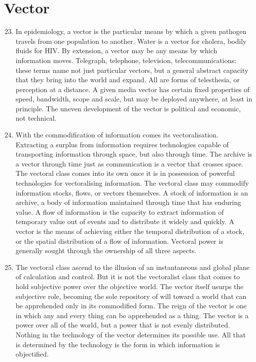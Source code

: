 \documentclass[letterpaper,12pt,english]{sphinxmanual}
\begin{document}
\section{Vector}
\label{wark:vector}\begin{enumerate}
\setcounter{enumi}{22}
\item {} 
In epidemiology, a vector is the particular means by which a given pathogen travels from one population to another. Water is a vector for cholera, bodily fluids for HIV. By extension, a vector may be any means by which information moves. Telegraph, telephone, television, telecommunications: these terms name not just particular vectors, but a general abstract capacity that they bring into the world and expand. All are forms of telesthesia, or perception at a distance. A given media vector has certain fixed properties of speed, bandwidth, scope and scale, but may be deployed anywhere, at least in principle. The uneven development of the vector is political and economic, not technical.

\item {} 
With the commodification of information comes its vectoralisation. Extracting a surplus from information requires technologies capable of transporting information through space, but also through time. The archive is a vector through time just as communication is a vector that crosses space. The vectoral class comes into its own once it is in possession of powerful technologies for vectoralising information. The vectoral class may commodify information stocks, flows, or vectors themselves. A stock of information is an archive, a body of information maintained through time that has enduring value. A flow of information is the capacity to extract information of temporary value out of events and to distribute it widely and quickly. A vector is the means of achieving either the temporal distribution of a stock, or the spatial distribution of a flow of information. Vectoral power is generally sought through the ownership of all three aspects.

\item {} 
The vectoral class ascend to the illusion of an instantaneous and global plane of calculation and control. But it is not the vectoralist class that comes to hold subjective power over the objective world. The vector itself usurps the subjective role, becoming the sole repository of will toward a world that can be apprehended only in its commodified form. The reign of the vector is one in which any and every thing can be apprehended as a thing. The vector is a power over all of the world, but a power that is not evenly distributed. Nothing in the technology of the vector determines its possible use. All that is determined by the technology is the form in which information is objectified.


\end{enumerate}
\end{document}
